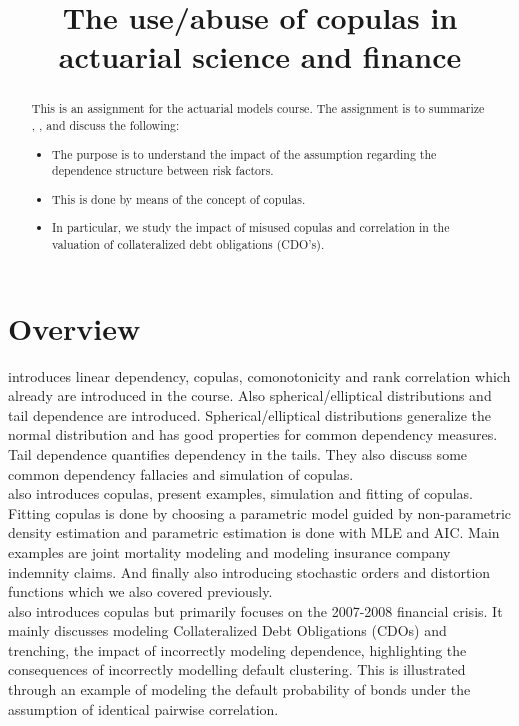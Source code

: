 \documentclass[a4paper,12pt]{article}
\title{The use/abuse of copulas in actuarial science and finance}
\date{}
\begin{document}
\maketitle

\begin{abstract}
    This is an assignment for the actuarial models course.
    The assignment is to summarize \cite{dempster_correlation_2002}, \cite{frees_understanding_1998},
    \cite{donnelly_devil_nodate} and discuss the following:

    \begin{itemize}
        \item  The purpose is to understand the impact of the assumption regarding
              the dependence structure between risk factors.
        \item  This is done by means of the concept of copulas.
        \item  In particular, we study the impact of misused copulas and correlation in the
              valuation of collateralized debt obligations (CDO's).
    \end{itemize}

\end{abstract}

\section{Overview}
\cite{dempster_correlation_2002} introduces linear dependency, copulas, comonotonicity and rank correlation which
already are introduced in the course. Also spherical/elliptical distributions and tail dependence are introduced.
Spherical/elliptical distributions generalize the normal distribution and has good properties for common dependency
measures.  Tail dependence quantifies dependency in the tails. They also discuss some
common dependency fallacies and simulation of copulas.\\

\cite{frees_understanding_1998} also introduces copulas, present examples, simulation
and fitting of copulas. Fitting copulas is done by choosing a parametric model
guided by non-parametric density estimation and parametric estimation is done
with MLE and AIC.
Main examples are joint mortality modeling and modeling insurance company indemnity claims.
And finally also introducing stochastic orders and distortion functions which we also covered previously. \\

\cite{donnelly_devil_nodate} also introduces copulas but primarily focuses on the 2007-2008 financial crisis.
It mainly discusses modeling Collateralized Debt Obligations (CDOs) and trenching, the impact of
incorrectly modeling dependence, highlighting the consequences of incorrectly modelling default clustering.
This is illustrated through an example of modeling the default probability of bonds under the assumption
of identical pairwise correlation.
\end{document}
